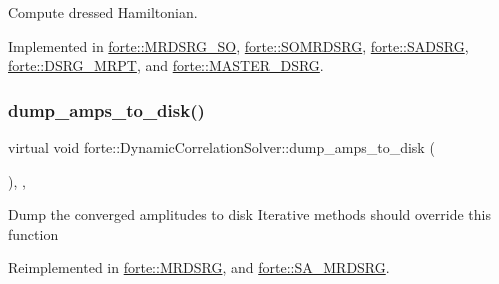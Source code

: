 Compute dressed Hamiltonian. 



Implemented in \mbox{\hyperlink{classforte_1_1_m_r_d_s_r_g___s_o_a2c927466355d27797fb2a7b5ff478779}{forte\+::\+M\+R\+D\+S\+R\+G\+\_\+\+SO}}, \mbox{\hyperlink{classforte_1_1_s_o_m_r_d_s_r_g_a124b4ab351075d25eec777872e3322f5}{forte\+::\+S\+O\+M\+R\+D\+S\+RG}}, \mbox{\hyperlink{classforte_1_1_s_a_d_s_r_g_afd26cf60145a7e46f65fb07f44e93021}{forte\+::\+S\+A\+D\+S\+RG}}, \mbox{\hyperlink{classforte_1_1_d_s_r_g___m_r_p_t_a929556373e50b9baeefbdd461fd72124}{forte\+::\+D\+S\+R\+G\+\_\+\+M\+R\+PT}}, and \mbox{\hyperlink{classforte_1_1_m_a_s_t_e_r___d_s_r_g_a4c4e581766abada72d8e1742a7887d2a}{forte\+::\+M\+A\+S\+T\+E\+R\+\_\+\+D\+S\+RG}}.

\mbox{\label{classforte_1_1_dynamic_correlation_solver_a504b343c559a62b9d13ecf8cec44f3d2}} 
\subsubsection{\texorpdfstring{dump\+\_\+amps\+\_\+to\+\_\+disk()}{dump\_amps\_to\_disk()}}
{\footnotesize\ttfamily virtual void forte\+::\+Dynamic\+Correlation\+Solver\+::dump\+\_\+amps\+\_\+to\+\_\+disk (\begin{DoxyParamCaption}{ }\end{DoxyParamCaption})\hspace{0.3cm}{\ttfamily [inline]}, {\ttfamily [protected]}, {\ttfamily [virtual]}}

Dump the converged amplitudes to disk Iterative methods should override this function 

Reimplemented in \mbox{\hyperlink{classforte_1_1_m_r_d_s_r_g_aee87aff2861a0aa4be1d6486d7054049}{forte\+::\+M\+R\+D\+S\+RG}}, and \mbox{\hyperlink{classforte_1_1_s_a___m_r_d_s_r_g_a53d329b17db498bf6c3e6c3984195bcb}{forte\+::\+S\+A\+\_\+\+M\+R\+D\+S\+RG}}.

\mbox{\label{classforte_1_1_dynamic_correlation_solver_ab2096aa0b894db57cf747c86f1252e08}} 
